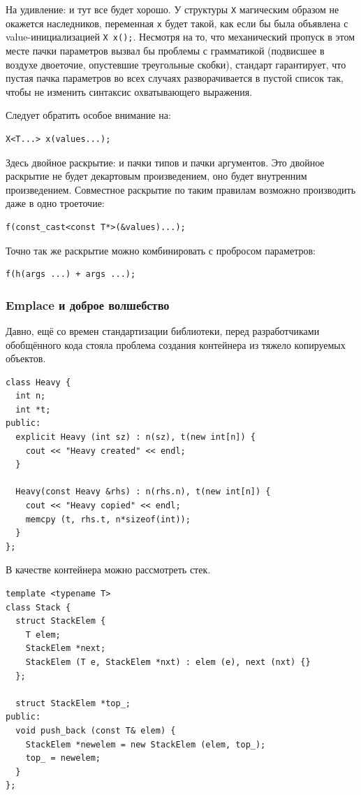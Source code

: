 \documentclass[a4paper,12pt,oneside]{article}
\begin{document}
На удивление: и тут все будет хорошо. У структуры \lstinline!X! магическим образом не окажется наследников, переменная \lstinline!x! будет такой, как если бы была объявлена с value-инициализацией \lstinline!X x();!. Несмотря на то, что механический пропуск в этом месте пачки параметров вызвал бы проблемы с грамматикой (подвисшее в воздухе двоеточие, опустевшие треугольные скобки), стандарт гарантирует, что пустая пачка параметров во всех случаях разворачивается в пустой список так, чтобы не изменить синтаксис охватывающего выражения.

Следует обратить особое внимание на:

\begin{lstlisting}
X<T...> x(values...);
\end{lstlisting}

Здесь двойное раскрытие: и пачки типов и пачки аргументов. Это двойное раскрытие не будет декартовым произведением, оно будет внутренним произведением. Совместное раскрытие по таким правилам возможно производить даже в одно троеточие:

\begin{lstlisting}
f(const_cast<const T*>(&values)...); 
\end{lstlisting}

Точно так же раскрытие можно комбинировать с пробросом параметров:

\begin{lstlisting}
f(h(args ...) + args ...);
\end{lstlisting}

\subsubsection{Emplace и доброе волшебство}

Давно, ещё со времен стандартизации библиотеки, перед разработчиками обобщённого кода стояла проблема создания контейнера из тяжело копируемых объектов.

\begin{lstlisting}
class Heavy {
  int n;
  int *t;
public:
  explicit Heavy (int sz) : n(sz), t(new int[n]) {
    cout << "Heavy created" << endl;
  }

  Heavy(const Heavy &rhs) : n(rhs.n), t(new int[n]) {
    cout << "Heavy copied" << endl;
    memcpy (t, rhs.t, n*sizeof(int));
  }
};
\end{lstlisting}

В качестве контейнера можно рассмотреть стек.

\begin{lstlisting}
template <typename T>
class Stack {
  struct StackElem {
    T elem;
    StackElem *next;
    StackElem (T e, StackElem *nxt) : elem (e), next (nxt) {}
  };

  struct StackElem *top_;
public:
  void push_back (const T& elem) {
    StackElem *newelem = new StackElem (elem, top_);
    top_ = newelem;
  }
};
\end{lstlisting}
\end{document}
